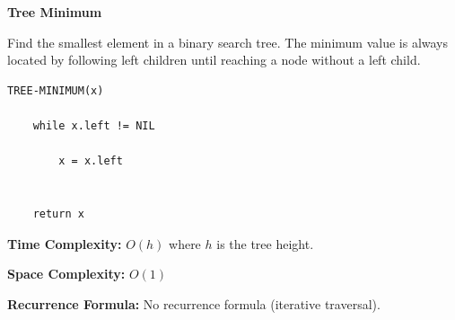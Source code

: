 \documentclass[a4paper,12pt]{article}
\begin{document}
\begin{tcolorbox}[
    colback=gray!30,
    colframe=black,
    boxrule=1pt,
    arc=0mm
]

\begin{tcolorbox}[
    colback=gray!10,
    colframe=black,
    arc=0mm
]
\centering
{\Huge\bfseries Tree Minimum}
\end{tcolorbox}


\begin{tcolorbox}[
    colback=gray!10,
    colframe=black,
    arc=0mm
]
\small
Find the smallest element in a binary search tree.
The minimum value is always located by following left children
until reaching a node without a left child.
\end{tcolorbox}


\begin{tcolorbox}[
    colback=black!5,
    colframe=black,
    arc=0mm,
    title=Pseudo-code
]
\tiny
\begin{lstlisting}
TREE-MINIMUM(x)

    while x.left != NIL

        x = x.left


    return x
\end{lstlisting}
\end{tcolorbox}


\begin{tcolorbox}[
    colback=cyan!20,
    colframe=black,
    arc=0mm
]
\small
\textbf{Time Complexity:}
$O(h)$ where $h$ is the tree height.
\end{tcolorbox}


\begin{tcolorbox}[
    colback=violet!20,
    colframe=black,
    arc=0mm
]
\small
\textbf{Space Complexity:}
$O(1)$
\end{tcolorbox}


\begin{tcolorbox}[
    colback=pink!20,
    colframe=black,
    arc=0mm
]
\small
\textbf{Recurrence Formula:}
No recurrence formula (iterative traversal).
\end{tcolorbox}

\end{tcolorbox}
\end{document}
